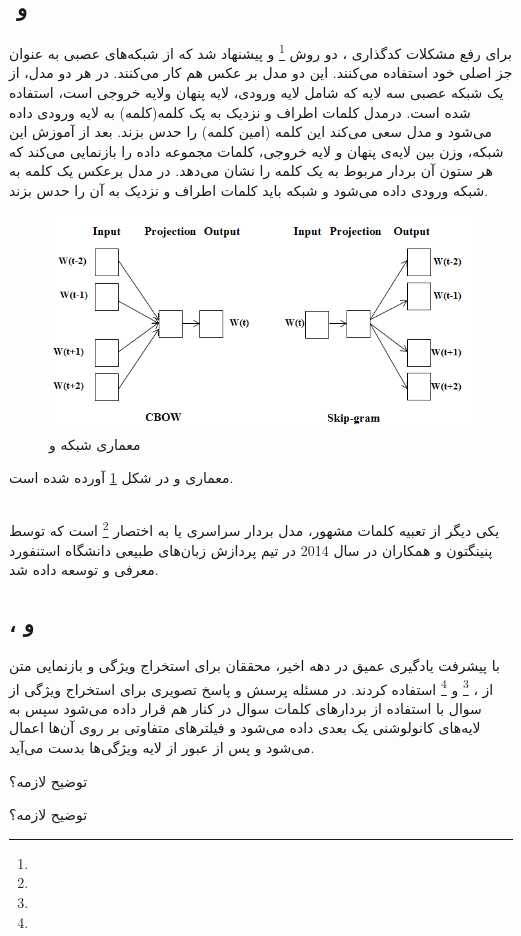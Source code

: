 \subsection{‌ و }
	برای رفع مشکلات کدگذاری 
	، دو روش
	\footnote{}
	\cite{mikolov2013efficient}
	و
	\cite{mikolov2013efficient}
	پیشنهاد شد که از شبکه‌های عصبی به عنوان جز اصلی خود استفاده می‌کنند. این دو مدل بر عکس هم کار می‌کنند.	در هر دو مدل، از یک شبکه عصبی سه لایه که شامل لایه ورودی، لایه پنهان ولایه خروجی است، استفاده شده است. درمدل 
	کلمات اطراف و نزدیک به یک کلمه(کلمه) به لایه ورودی داده می‌شود و مدل سعی می‌کند این کلمه (امین کلمه) را حدس بزند.  بعد از آموزش این شبکه‌، وزن بین لایه‌ی پنهان و لایه خروجی، کلمات مجموعه داده را بازنمایی می‌کند که هر ستون آن بردار مربوط به یک کلمه را نشان می‌دهد. در مدل
	برعکس 
	یک کلمه به شبکه ورودی داده می‌شود و شبکه باید کلمات اطراف و نزدیک به آن را حدس بزند. 
	\begin{figure}
		\centerline{\includegraphics[scale=0.5]{images/2.png}}
		\caption{
			معماری شبکه 
			و
		}
		\label{fig:CBOW&skip-gram}
	\end{figure}
	معماری 
	و
	در شکل 
	\ref{fig:CBOW&skip-gram}
	آورده شده است. 

\subsection{}
	یکی دیگر از تعبیه کلمات مشهور، مدل بردار سراسری یا به اختصار 
	\footnote{}
	است که توسط پنینگتون و همکاران 
	\cite{pennington2014glove}
	در سال 2014 در تیم پردازش زبان‌های طبیعی دانشگاه استنفورد معرفی و توسعه داده شد.
	
\subsection{‌، ‌‌و }
	با پیشرفت یادگیری عمیق در دهه اخیر، محققان برای استخراج ویژگی و بازنمایی متن از
	،
	\footnote{}
	\cite{hochreiter1997long}
	و
	\footnote{}
	\cite{cho2014learning}
	استفاده کردند. در مسئله پرسش و پاسخ تصویری برای استخراج ویژگی از سوال با استفاده از 
	بردارهای کلمات سوال در کنار هم قرار داده می‌شود سپس به لایه‌های کانولوشنی یک بعدی داده می‌شود و فیلتر‌های متفاوتی بر روی آن‌ها اعمال می‌شود و پس از عبور از لایه‌ 
	ویژگی‌ها بدست می‌آید.
	
	توضیح 
	لازمه؟
	
	توضیح 
		لازمه؟
